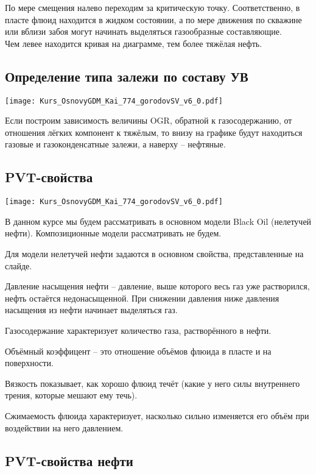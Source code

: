 \documentclass[main.tex]{subfiles}
\begin{document}
По мере смещения налево переходим за критическую точку. Соответственно, в пласте флюид находится в жидком состоянии, а по мере движения по скважине или вблизи забоя могут начинать выделяться газообразные составляющие.
\\

Чем левее находится кривая на диаграмме, тем более тяжёлая нефть.

\subsection{Определение типа залежи по составу УВ}

\texttt{[image: Kurs\_OsnovyGDM\_Kai\_774\_gorodovSV\_v6\_0.pdf]}

Если построим зависимость величины OGR, обратной к газосодержанию, от отношения лёгких компонент к тяжёлым, то внизу на графике будут находиться газовые и газоконденсатные залежи, а наверху -- нефтяные.

\subsection{PVT-свойства}

\texttt{[image: Kurs\_OsnovyGDM\_Kai\_774\_gorodovSV\_v6\_0.pdf]}

В данном курсе мы будем рассматривать в основном модели Black Oil (нелетучей нефти). Композиционные модели рассматривать не будем.

Для модели нелетучей нефти задаются в основном свойства, представленные на слайде.

Давление насыщения нефти -- давление, выше которого весь газ уже растворился, нефть остаётся недонасыщенной.
При снижении давления ниже давления насыщения из нефти начинает выделяться газ.

Газосодержание характеризует количество газа, растворённого в нефти.

Объёмный коэффицент -- это отношение объёмов флюида в пласте и на поверхности.

Вязкость показывает, как хорошо флюид течёт (какие у него силы внутреннего трения, которые мешают ему течь).

Сжимаемость флюида характеризует, насколько сильно изменяется его объём при воздействии на него давлением.

\subsection{PVT-свойства нефти}
\end{document}
